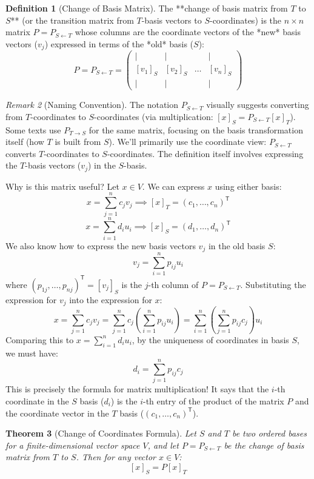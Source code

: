 \documentclass[11pt]{article}
\newtheorem{theorem}{Theorem}[section]
\theoremstyle{definition}
\newtheorem{definition}[theorem]{Definition}
\theoremstyle{remark}
\newtheorem{remark}[theorem]{Remark}
\newcommand{\coord}[2]{[#1]_{#2}} %
\newcommand{\tr}{^\mathsf{T}} %
\begin{document}
\begin{definition}[Change of Basis Matrix]
    The **change of basis matrix from $T$ to $S$** (or the transition matrix from $T$-basis vectors to $S$-coordinates) is the $n \times n$ matrix $P = P_{S \leftarrow T}$ whose columns are the coordinate vectors of the *new* basis vectors ($v_j$) expressed in terms of the *old* basis ($S$):
    \[ P = P_{S \leftarrow T} = \begin{pmatrix} | & | & & | \\ \coord{v_1}{S} & \coord{v_2}{S} & \dots & \coord{v_n}{S} \\ | & | & & | \end{pmatrix} \]
\end{definition}

\begin{remark}[Naming Convention]
    The notation $P_{S \leftarrow T}$ visually suggests converting from $T$-coordinates to $S$-coordinates (via multiplication: $\coord{x}{S} = P_{S \leftarrow T} \coord{x}{T}$). Some texts use $P_{T \to S}$ for the same matrix, focusing on the basis transformation itself (how $T$ is built from $S$). We'll primarily use the coordinate view: $P_{S \leftarrow T}$ converts $T$-coordinates to $S$-coordinates. The definition itself involves expressing the $T$-basis vectors ($v_j$) in the $S$-basis.
\end{remark}

Why is this matrix useful? Let $x \in V$. We can express $x$ using either basis:
\[ x = \sum_{j=1}^n c_j v_j \implies \coord{x}{T} = (c_1, \dots, c_n)\tr \]
\[ x = \sum_{i=1}^n d_i u_i \implies \coord{x}{S} = (d_1, \dots, d_n)\tr \]
We also know how to express the new basis vectors $v_j$ in the old basis $S$:
\[ v_j = \sum_{i=1}^n p_{ij} u_i \]
where $(p_{1j}, \dots, p_{nj})\tr = \coord{v_j}{S}$ is the $j$-th column of $P = P_{S \leftarrow T}$.
Substituting the expression for $v_j$ into the expression for $x$:
\[ x = \sum_{j=1}^n c_j v_j = \sum_{j=1}^n c_j \left( \sum_{i=1}^n p_{ij} u_i \right) = \sum_{i=1}^n \left( \sum_{j=1}^n p_{ij} c_j \right) u_i \]
Comparing this to $x = \sum_{i=1}^n d_i u_i$, by the uniqueness of coordinates in basis $S$, we must have:
\[ d_i = \sum_{j=1}^n p_{ij} c_j \]
This is precisely the formula for matrix multiplication! It says that the $i$-th coordinate in the $S$ basis ($d_i$) is the $i$-th entry of the product of the matrix $P$ and the coordinate vector in the $T$ basis ($(c_1, \dots, c_n)\tr$).

\begin{theorem}[Change of Coordinates Formula]
    Let $S$ and $T$ be two ordered bases for a finite-dimensional vector space $V$, and let $P = P_{S \leftarrow T}$ be the change of basis matrix from $T$ to $S$. Then for any vector $x \in V$:
    \[ \coord{x}{S} = P \coord{x}{T} \]
\end{theorem}
\end{document}
